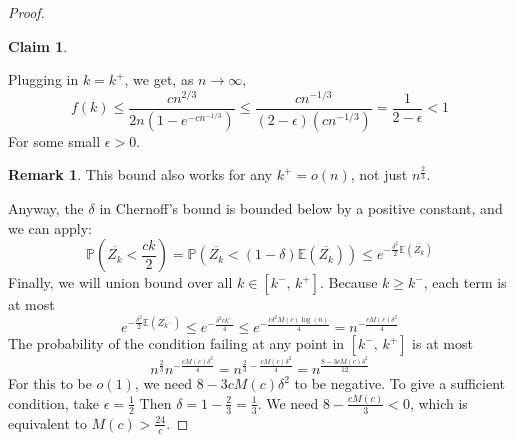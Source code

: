\documentclass{amsart}
\theoremstyle{plain}
\newtheorem*{claim}{\textbf{Claim}}
\theoremstyle{definition}
\newtheorem*{rk}{\textbf{Remark}}
\begin{document}
\begin{proof}
\begin{claim}
    \end{claim}
    \noindent Plugging in $k = k^{+}$, we get, as $n \to \infty$,
    \begin{equation}
        f(k) \leq
        \frac{cn^{2/3}}{2n\left(1 - e^{-cn^{-1/3}}\right)} \leq
        \frac{cn^{-1/3}}{(2-\epsilon)\left(cn^{-1/3}\right)} = \frac{1}{2-\epsilon} < 1
        \label{eq:fbound_2}
    \end{equation}
    For some small $\epsilon > 0$.
    \begin{rk}
        This bound also works for any $k^+ = o(n)$, not just $n^{\frac{2}{3}}$.
    \end{rk}

    \noindent Anyway, the $\delta$ in Chernoff's bound is bounded below by a positive constant, and we can apply:
    \begin{equation}
        \mathbb{P}\left(\overline{Z_k} < \frac{ck}{2}\right) =
        \mathbb{P}\left(\overline{Z_k} < (1 - \delta)\mathbb{E}(\overline{Z_k})\right) \leq
        e^{-\frac{\delta^2}{2}\mathbb{E}(\overline{Z_k})}
        \label{eq:chernoff}
    \end{equation}
    \noindent Finally, we will union bound over all $k \in [k^{-}, \, k^{+}]$.
    Because $k \geq k^-$, each term is at most
    \begin{equation}
        e^{-\frac{\delta^2}{2}\mathbb{E}(\overline{Z_{k^-}})} \leq
        e^{-\frac{\delta^{2}ck^-}{4}} \leq
        e^{-\frac{c\delta^{2}M(c)\log(n)}{4}} =
        n^{-\frac{cM(c)\delta^2}{4}}
        \label{eq:logbound}
    \end{equation}
    The probability of the condition failing at any point in $[k^{-}, \, k^{+}]$ is at most
    \begin{equation}
        n^{\frac{2}{3}}n^{-\frac{cM(c)\delta^2}{4}} = n^{\frac{2}{3} - \frac{cM(c)\delta^2}{4}} =
        n^{\frac{8 - 3cM(c)\delta^2}{12}}
        \label{eq:finalbound}
    \end{equation}
    \noindent For this to be $o(1)$, we need $8 - 3cM(c)\delta^2$ to be negative.
    To give a sufficient condition, take $\epsilon = \frac{1}{2}$ Then $\delta =  1 - \frac{2}{3} = \frac{1}{3}$.
    We need $8 - \frac{cM(c)}{3} < 0$, which is equivalent to $M(c) > \frac{24}{c}$.
    \end{proof}
\end{document}
